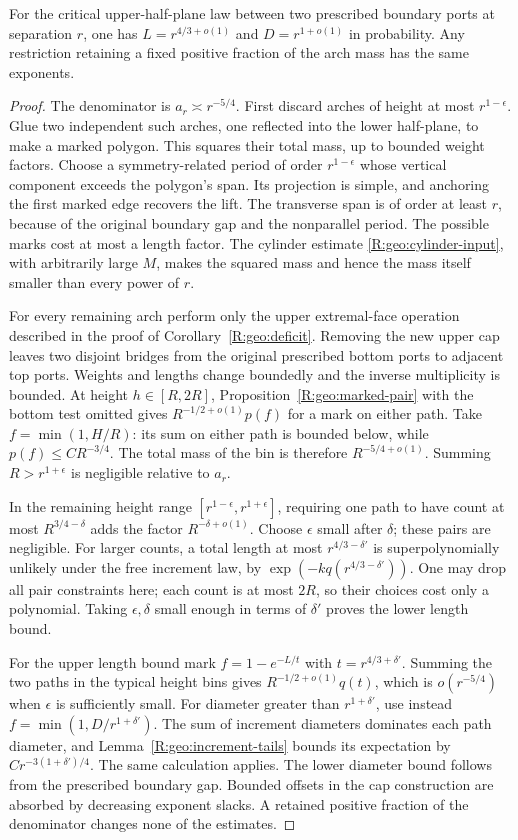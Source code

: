\begin{proposition}\label{R:geo:arch-law}
For the critical upper-half-plane law between two prescribed boundary
ports at separation $r$, one has $L=r^{4/3+o(1)}$ and
$D=r^{1+o(1)}$ in probability.  Any restriction retaining a fixed
positive fraction of the arch mass has the same exponents.
\end{proposition}
\begin{proof}
The denominator is $a_r\asymp r^{-5/4}$.  First discard arches of
height at most $r^{1-\epsilon}$.  Glue two independent such arches,
one reflected into the lower half-plane, to make a marked polygon.
This squares their total mass, up to bounded weight factors.  Choose
a symmetry-related period of order $r^{1-\epsilon}$ whose vertical
component exceeds the polygon's span.  Its projection is simple,
and anchoring the first marked edge recovers the lift.  The transverse
span is of order at least $r$, because of the original boundary gap
and the nonparallel period.  The possible marks cost at most a length
factor.  The cylinder estimate \eqref{R:geo:cylinder-input}, with
arbitrarily large $M$, makes the squared mass and hence the mass
itself smaller than every power of $r$.

For every remaining arch perform only the upper extremal-face
operation described in the proof of Corollary~\ref{R:geo:deficit}.
Removing the new upper cap leaves two disjoint bridges from the
original prescribed bottom ports to adjacent top ports.  Weights and
lengths change boundedly and the inverse multiplicity is bounded.
At height $h\in[R,2R]$, Proposition~\ref{R:geo:marked-pair} with
the bottom test omitted gives
$R^{-1/2+o(1)}p(f)$ for a mark on either path.  Take
$f=\min(1,H/R)$: its sum on either path is bounded below, while
$p(f)\le CR^{-3/4}$.  The total mass of the bin is therefore
$R^{-5/4+o(1)}$.  Summing $R>r^{1+\epsilon}$ is negligible relative
to $a_r$.

In the remaining height range $[r^{1-\epsilon},r^{1+\epsilon}]$,
requiring one path to have count at most $R^{3/4-\delta}$ adds the
factor $R^{-\delta+o(1)}$.  Choose $\epsilon$ small after $\delta$;
these pairs are negligible.  For larger counts, a total length at
most $r^{4/3-\delta'}$ is superpolynomially unlikely under the free
increment law, by $\exp(-k q(r^{4/3-\delta'}))$.  One may drop
all pair constraints here; each count is at most $2R$, so their
choices cost only a polynomial.  Taking $\epsilon,\delta$ small
enough in terms of $\delta'$ proves the lower length bound.

For the upper length bound mark $f=1-e^{-L/t}$ with
$t=r^{4/3+\delta'}$.  Summing the two paths in the typical height
bins gives $R^{-1/2+o(1)}q(t)$, which is $o(r^{-5/4})$ when
$\epsilon$ is sufficiently small.  For diameter greater than
$r^{1+\delta'}$, use instead $f=\min(1,D/r^{1+\delta'})$.
The sum of increment diameters dominates each path diameter, and
Lemma~\ref{R:geo:increment-tails} bounds its expectation by
$Cr^{-3(1+\delta')/4}$.  The same calculation applies.  The lower
diameter bound follows from the prescribed boundary gap.  Bounded
offsets in the cap construction are absorbed by decreasing exponent
slacks.  A retained positive fraction of the denominator changes
none of the estimates.
\end{proof}
